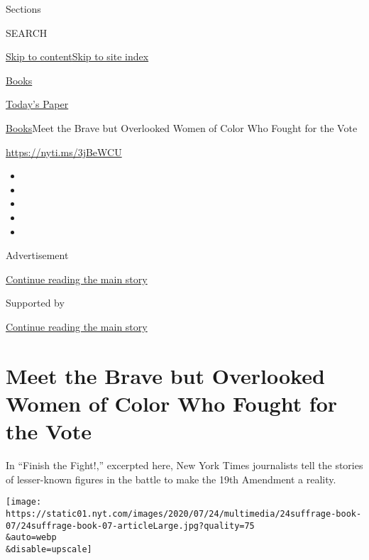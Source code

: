 Sections

SEARCH

\protect\hyperlink{site-content}{Skip to
content}\protect\hyperlink{site-index}{Skip to site index}

\href{https://www.nytimes.com/section/books}{Books}

\href{https://myaccount.nytimes.com/auth/login?response_type=cookie\&client_id=vi}{}

\href{https://www.nytimes.com/section/todayspaper}{Today's Paper}

\href{/section/books}{Books}\textbar{}Meet the Brave but Overlooked
Women of Color Who Fought for the Vote

\url{https://nyti.ms/3jBeWCU}

\begin{itemize}
\item
\item
\item
\item
\item
\end{itemize}

Advertisement

\protect\hyperlink{after-top}{Continue reading the main story}

Supported by

\protect\hyperlink{after-sponsor}{Continue reading the main story}

\hypertarget{meet-the-brave-but-overlooked-women-of-color-who-fought-for-the-vote}{%
\section{Meet the Brave but Overlooked Women of Color Who Fought for the
Vote}\label{meet-the-brave-but-overlooked-women-of-color-who-fought-for-the-vote}}

In ``Finish the Fight!,'' excerpted here, New York Times journalists
tell the stories of lesser-known figures in the battle to make the 19th
Amendment a reality.

\texttt{[image: https://static01.nyt.com/images/2020/07/24/multimedia/24suffrage-book-07/24suffrage-book-07-articleLarge.jpg?quality=75\\\&auto=webp\\\&disable=upscale]}

